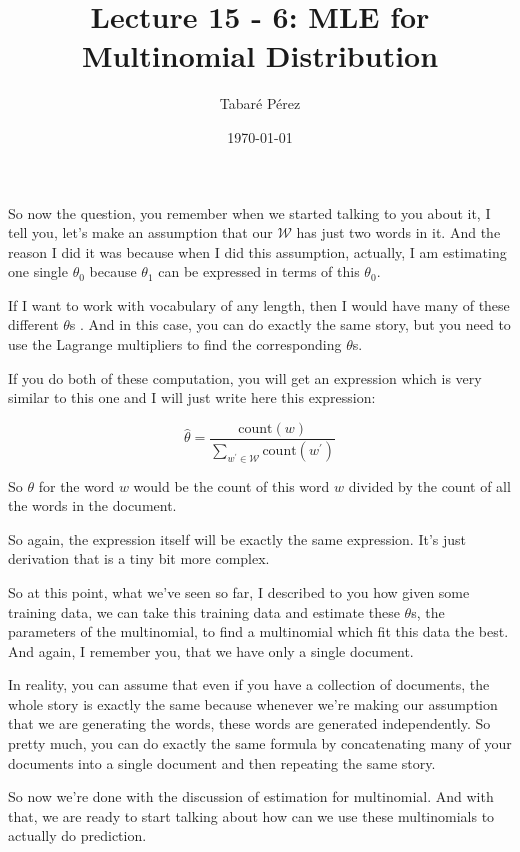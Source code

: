 \documentclass[a4paper, 12pt]{article}
\author{Tabaré Pérez}
\date{\today}
\title{Lecture 15 - 6: MLE for Multinomial Distribution}
\begin{document}
\maketitle
So now the question, you remember when we started talking to you about it, I
tell you, let's make an assumption that our \(\mathcal{W}\) has just two words
in it. And the reason I did it was because when I did this assumption, actually,
I am estimating one single \(\theta_0\) because \(\theta_1\) can be expressed in
terms of this \(\theta_0\).

If I want to work with vocabulary of any length, then I would have many of these
different \(\theta\)s . And in this case, you can do exactly the same story, but
you need to use the Lagrange multipliers to find the corresponding \(\theta\)s.

If you do both of these computation, you will get an expression which is very
similar to this one and I will just write here this expression:

\begin{equation}
\hat{\theta}=\frac{\text{count}(w)}{\sum_{w^\prime \in \mathcal{W}} \text{count}(w^\prime)}
\end{equation}

So \(\theta\) for the word \(w\) would be the count of this word \(w\) divided
by the count of all the words in the document.

So again, the expression itself will be exactly the same expression. It's just
derivation that is a tiny bit more complex.

So at this point, what we've seen so far, I described to you how given some
training data, we can take this training data and estimate these \(\theta\)s,
the parameters of the multinomial, to find a multinomial which fit this data the
best. And again, I remember you, that we have only a single document.

In reality, you can assume that even if you have a collection of documents, the
whole story is exactly the same because whenever we're making our assumption
that we are generating the words, these words are generated independently. So
pretty much, you can do exactly the same formula by concatenating many of your
documents into a single document and then repeating the same story.

So now we're done with the discussion of estimation for multinomial. And with
that, we are ready to start talking about how can we use these multinomials to
actually do prediction.
\end{document}
